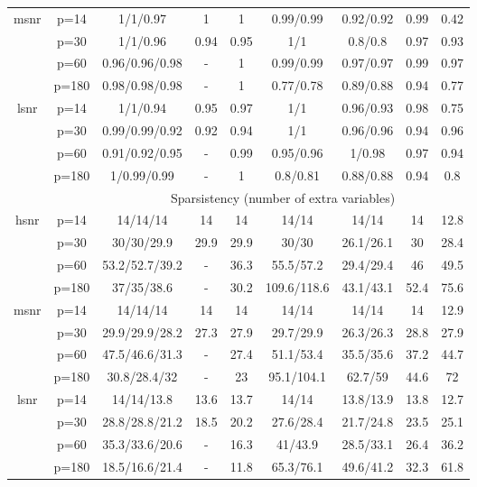 \begin{table}[ht]
{\begin{tabular}{|c|c|ccccccc|}
  \midrule\multirow{4}[2]{*}{msnr} & p=14 & 1/1/0.97 & 1 & 1 & 0.99/0.99 & 0.92/0.92 & 0.99 & 0.42 \\ 
   & p=30 & 1/1/0.96 & 0.94 & 0.95 & 1/1 & 0.8/0.8 & 0.97 & 0.93 \\ 
   & p=60 & 0.96/0.96/0.98 & - & 1 & 0.99/0.99 & 0.97/0.97 & 0.99 & 0.97 \\ 
   & p=180 & 0.98/0.98/0.98 & - & 1 & 0.77/0.78 & 0.89/0.88 & 0.94 & 0.77 \\ 
  \midrule\multirow{4}[2]{*}{lsnr} & p=14 & 1/1/0.94 & 0.95 & 0.97 & 1/1 & 0.96/0.93 & 0.98 & 0.75 \\ 
   & p=30 & 0.99/0.99/0.92 & 0.92 & 0.94 & 1/1 & 0.96/0.96 & 0.94 & 0.96 \\ 
   & p=60 & 0.91/0.92/0.95 & - & 0.99 & 0.95/0.96 & 1/0.98 & 0.97 & 0.94 \\ 
   & p=180 & 1/0.99/0.99 & - & 1 & 0.8/0.81 & 0.88/0.88 & 0.94 & 0.8 \\ 
   \midrule 
 \multicolumn{1}{|c}{} &       & \multicolumn{7}{c|}{Sparsistency (number of extra variables)} \\
\midrule\multirow{4}[2]{*}{hsnr} & p=14 & 14/14/14 & 14 & 14 & 14/14 & 14/14 & 14 & 12.8 \\ 
   & p=30 & 30/30/29.9 & 29.9 & 29.9 & 30/30 & 26.1/26.1 & 30 & 28.4 \\ 
   & p=60 & 53.2/52.7/39.2 & - & 36.3 & 55.5/57.2 & 29.4/29.4 & 46 & 49.5 \\ 
   & p=180 & 37/35/38.6 & - & 30.2 & 109.6/118.6 & 43.1/43.1 & 52.4 & 75.6 \\ 
  \midrule\multirow{4}[2]{*}{msnr} & p=14 & 14/14/14 & 14 & 14 & 14/14 & 14/14 & 14 & 12.9 \\ 
   & p=30 & 29.9/29.9/28.2 & 27.3 & 27.9 & 29.7/29.9 & 26.3/26.3 & 28.8 & 27.9 \\ 
   & p=60 & 47.5/46.6/31.3 & - & 27.4 & 51.1/53.4 & 35.5/35.6 & 37.2 & 44.7 \\ 
   & p=180 & 30.8/28.4/32 & - & 23 & 95.1/104.1 & 62.7/59 & 44.6 & 72 \\ 
  \midrule\multirow{4}[2]{*}{lsnr} & p=14 & 14/14/13.8 & 13.6 & 13.7 & 14/14 & 13.8/13.9 & 13.8 & 12.7 \\ 
   & p=30 & 28.8/28.8/21.2 & 18.5 & 20.2 & 27.6/28.4 & 21.7/24.8 & 23.5 & 25.1 \\ 
   & p=60 & 35.3/33.6/20.6 & - & 16.3 & 41/43.9 & 28.5/33.1 & 26.4 & 36.2 \\ 
   & p=180 & 18.5/16.6/21.4 & - & 11.8 & 65.3/76.1 & 49.6/41.2 & 32.3 & 61.8 \\ 
   \bottomrule 
\end{tabular}
}
\end{table}
